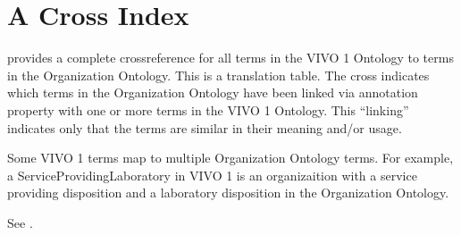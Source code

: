 \documentclass[letterpaper,10pt,english]{sphinxmanual}
\begin{document}
\section{A Cross Index}
\label{\detokenize{vivo-to-org:a-cross-index}}
\sphinxAtStartPar
{\hyperref[\detokenize{vivo-to-org:table-10}]{}} provides a complete cross\sphinxhyphen{}reference for all terms in the VIVO 1 Ontology to
terms in the Organization Ontology.  This is  a translation table.  The cross
indicates which terms in the Organization Ontology have been linked via annotation
property
{\hyperref[\detokenize{doc-ORG_1000001::doc}]{}} with one or more terms in the VIVO 1 Ontology.  This “linking”
indicates only that the terms are similar in their meaning and/or usage.

\sphinxAtStartPar
Some VIVO 1 terms map to multiple Organization Ontology terms.  For example, a
ServiceProvidingLaboratory in VIVO 1 is an organizaition with a service
providing disposition and a laboratory disposition in the Organization Ontology.

\sphinxAtStartPar
See {\hyperref[\detokenize{vivo-to-org:table-10}]{}}.
\end{document}
